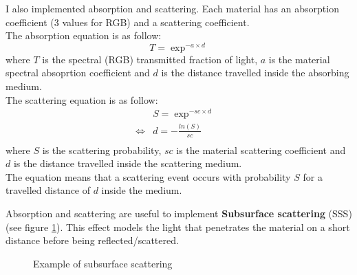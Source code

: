\documentclass[a4paper,10pt]{article}
\begin{document}
I also implemented absorption and scattering. Each material has an absorption coefficient (3 values for RGB) and a scattering coefficient. \\
The absorption equation is as follow:
\begin{equation}
	T = \exp^{-a \times d}
\end{equation}
where $T$ is the spectral (RGB) transmitted fraction of light, $a$ is the material spectral absoprtion coefficient and $d$ is the distance travelled inside the absorbing medium. \\

\noindent
The scattering equation is as follow:
\begin{equation}
\left.\begin{aligned}
	&S = \exp^{-sc \times d}& \\
	\iff
	&d = -\frac{ln(S)}{sc}&\\
\end{aligned}\right.
\end{equation}
where $S$ is the scattering probability, $sc$ is the material scattering coefficient and $d$ is the distance travelled inside the scattering medium. \\
The equation means that a scattering event occurs with probability $S$ for a travelled distance of $d$ inside the medium.

\noindent
Absorption and scattering are useful to implement \textbf{Subsurface scattering} (SSS) (see figure \ref{sss}). This effect models the light that penetrates the material on a short distance  before being reflected/scattered.


\begin{figure}[!Htb]\centering
    \label{sss}
    \caption{Example of subsurface scattering}
\end{figure}
\end{document}
